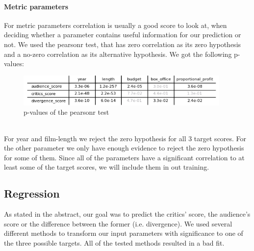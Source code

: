 \documentclass{article}
\begin{document}
    \paragraph{Metric parameters}
    For metric parameters correlation is usually a good score to look at, when deciding whether a parameter contains useful information for our prediction or not. We used the pearsonr test, that has zero correlation as its zero hypothesis and a no-zero correlation as its alternative hypothesis. We got the following p-values:\\
    \noindent
    \begin{figure}[h]
        \centering
        \includegraphics[width=0.94\textwidth]{imgs/metric_p.png}
        \caption{p-values of the pearsonr test}
        \label{fig:hypo_rejection}
    \end{figure}\\
    For year and film-length we reject the zero hypothesis for all 3 target scores. For the other parameter we only have enough evidence to reject the zero hypothesis for some of them. Since all of the parameters have a significant correlation to at least some of the target scores, we will include them in out training.
    
    
\subsection{Regression}
    As stated in the abstract, our goal was to predict the critics' score, the audience's score or the difference between the former (i.e. divergence).
    We used several different methods to transform our input parameters with significance to one of the three possible targets. All of the tested methods resulted in a bad fit.
\end{document}
